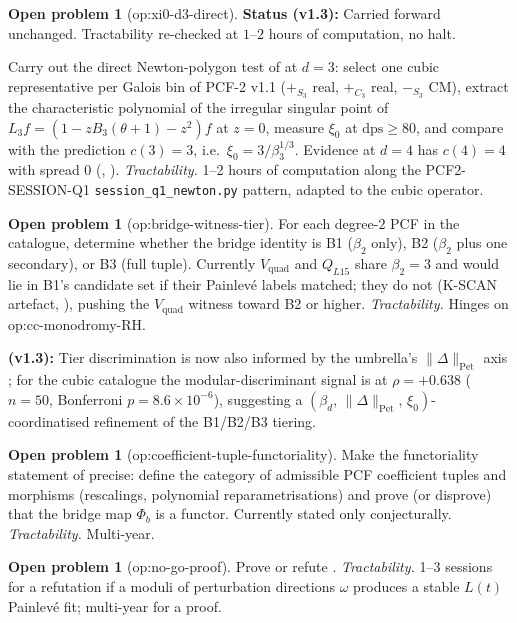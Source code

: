 \documentclass[11pt,reqno]{amsart}
\theoremstyle{plain}
\theoremstyle{definition}
\newtheorem{problem}[theorem]{Open problem}
\theoremstyle{remark}
\newcommand{\Lt}{L(t)}
\newcommand{\Vquad}{V_{\mathrm{quad}}}
\begin{document}
\begin{problem}[\textsf{op:xi0-d3-direct}]
\textbf{Status (v1.3):} Carried forward unchanged.
Tractability re-checked at $1$--$2$ hours of computation,
no halt.

Carry out the direct Newton-polygon test of
 at $d=3$: select one cubic
representative per Galois bin of PCF-2 v1.1
\cite{siarc_pcf2_v11} ($+_{S_3}$ real, $+_{C_3}$ real,
$-_{S_3}$ CM), extract the characteristic polynomial of the
irregular singular point of $L_3 f = (1 - z B_3(\theta+1) -
z^2) f$ at $z=0$, measure $\xi_0$ at $\mathrm{dps} \ge 80$,
and compare with the prediction $c(3) = 3$, i.e.\
$\xi_0 = 3 / \beta_3^{1/3}$. Evidence at $d=4$ has
$c(4) = 4$ with spread $0$
(, \cite{siarc_pcf2_session_q1}).
\emph{Tractability.} 1--2 hours of computation along the
PCF2-SESSION-Q1 \texttt{session\_q1\_newton.py} pattern,
adapted to the cubic operator.
\end{problem}

\begin{problem}[\textsf{op:bridge-witness-tier}]
For each degree-$2$ PCF in the catalogue, determine whether
the bridge identity is B1 ($\beta_2$ only), B2 ($\beta_2$
plus one secondary), or B3 (full tuple). Currently $\Vquad$
and $Q_{L15}$ share $\beta_2 = 3$ and would lie in B1's
candidate set if their Painlev\'e labels matched; they do
not (K-SCAN artefact, ), pushing the
$\Vquad$ witness toward B2 or higher.
\emph{Tractability.} Hinges on \textsf{op:cc-monodromy-RH}.

\textbf{(v1.3):} Tier discrimination is now also informed
by the umbrella's $\|\Delta\|_{\mathrm{Pet}}$ axis
\cite{siarc_pcf2_v13}; for the cubic catalogue the
modular-discriminant signal is at $\rho = +0.638$ ($n=50$,
Bonferroni $p = 8.6\times 10^{-6}$), suggesting a
$(\beta_d,\,\|\Delta\|_{\mathrm{Pet}},\,\xi_0)$-coordinatised
refinement of the B1/B2/B3 tiering.
\end{problem}

\begin{problem}[\textsf{op:coefficient-tuple-functoriality}]
Make the functoriality statement of 
precise: define the category of admissible PCF coefficient
tuples and morphisms (rescalings, polynomial
reparametrisations) and prove (or disprove) that the bridge
map $\Phi_b$ is a functor. Currently stated only
conjecturally.
\emph{Tractability.} Multi-year.
\end{problem}

\begin{problem}[\textsf{op:no-go-proof}]
Prove or refute .
\emph{Tractability.} 1--3 sessions for a refutation if a
moduli of perturbation directions $\omega$ produces a stable
$\Lt$ Painlev\'e fit; multi-year for a proof.
\end{problem}
\end{document}
